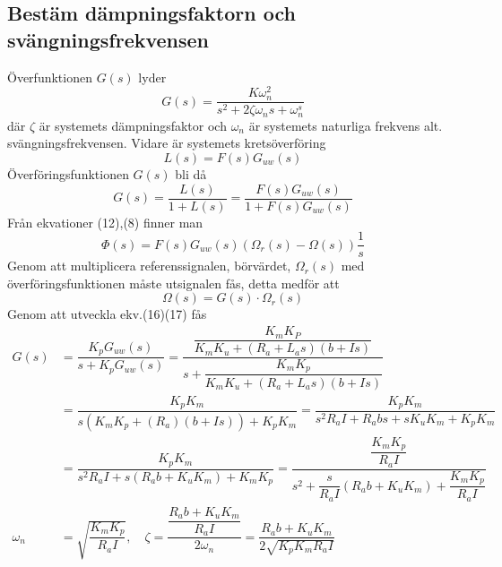 \documentclass[11pt]{article}
\begin{document}
\subsection{Bestäm dämpningsfaktorn och svängningsfrekvensen}
Överfunktionen $G(s)$ lyder
\begin{equation}
G(s) = \dfrac{K\omega_n^2}{s^2+2\zeta\omega_ns+\omega_n^s}
\end{equation}
där $\zeta$ är systemets dämpningsfaktor och $\omega_n$ är systemets naturliga frekvens alt. svängningsfrekvensen. Vidare är systemets  kretsöverföring
\begin{equation}
L(s)=F(s)G_{uw}(s)
\end{equation}
Överföringsfunktionen $G(s)$ bli då 
\begin{equation}
G(s)=\dfrac{L(s)}{1+L(s)} = \dfrac{F(s)G_{uw}(s)}{1+F(s)G_{uw}(s)}
\end{equation}
Från ekvationer (12),(8) finner man
\begin{equation}
\Phi(s) = F(s)G_{uw}(s)(\Omega_r(s)-\Omega(s))\frac{1}{s}
\end{equation}
Genom att multiplicera referenssignalen, börvärdet, $\Omega_r(s)$ med överföringsfunktionen måste utsignalen fås, detta medför att
\begin{equation}
\Omega(s)=G(s)\cdot \Omega_r(s)
\end{equation}
Genom att utveckla ekv.(16)(17) fås
\begin{equation*}
\begin{split}
G(s)&= \dfrac{K_pG_{uw}(s)}{s+K_pG_{uw}(s)} = \dfrac{\dfrac{K_mK_P}{K_mK_u+(R_a+L_as)(b+Is)}}{s+\dfrac{K_mK_p}{K_mK_u+(R_a+L_as)(b+Is)}}\\
&=
\dfrac{K_pK_m}{s(K_mK_p+(R_a)(b+Is))+K_pK_m} =
\dfrac{K_pK_m}{s^2R_aI+R_abs+sK_uK_m+K_pK_m}\\ &=
\dfrac{K_pK_m}{s^2R_aI+s(R_ab+K_uK_m)+K_mK_p} =
\dfrac{\dfrac{K_mK_p}{R_aI}}{s^2+\dfrac{s}{R_aI}(R_ab+K_uK_m)+\dfrac{K_mK_p}{R_aI}}\\
\omega_n&=\sqrt{\dfrac{K_mK_p}{R_aI}}, \quad
\zeta=\dfrac{\dfrac{R_ab+K_uK_m}{R_aI}}{2\omega_n} =\dfrac{R_ab+K_uK_m}{2\sqrt{K_pK_mR_aI}}
\end{split}
\end{equation*}
\end{document}
